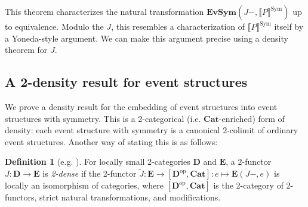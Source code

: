 \documentclass[11pt,a4paper]{article}
\theoremstyle{plain}
\theoremstyle{definition}
\newtheorem{definition}[theorem]{Definition}
\theoremstyle{remark}
\newcommand{\SES}{\mathbf{EvSym}}
\newcommand{\Cat}{\mathbf{Cat}}
\newcommand{\semSA}[1]{\llbracket #1 \rrbracket^{\mathrm{Sym}}}
\begin{document}
This theorem characterizes the natural transformation $\SES(J-, \semSA{P})$ up to equivalence. Modulo the $J$, this resembles a characterization of $\semSA{P}$ itself by a Yoneda-style argument. We can make this argument precise using a density theorem for $J$. 

\subsection{A 2-density result for event structures}
\label{subsec:2density}

\newcommand{\bE}{\mathbf{E}}
\newcommand{\bC}{\mathbf{C}}
\newcommand{\bD}{\mathbf{D}}

We prove a density result for the embedding of event structures into event structures with symmetry. This is a 2-categorical (i.e. $\Cat$-enriched) form of density: each event structure with symmetry is a canonical 2-colimit of  ordinary event structures. Another way of stating this is as follows:

\newcommand{\op}{\mathrm{op}}

\begin{definition}[e.g. \cite{BCECT}]
For locally small 2-categories $\bD$ and $\bE$, a $2$-functor $J : \bD \rightarrow \bE$ is \emph{2-dense} if the 2-functor $\tilde{J} : \bE \to [\bD^\op, \Cat] : e \mapsto \bE(J-, e)$ is locally an isomorphism of categories, where $[\bD^\op, \Cat]$ is the 2-category of 2-functors, strict natural transformations, and modifications. 
\end{definition}
\end{document}
